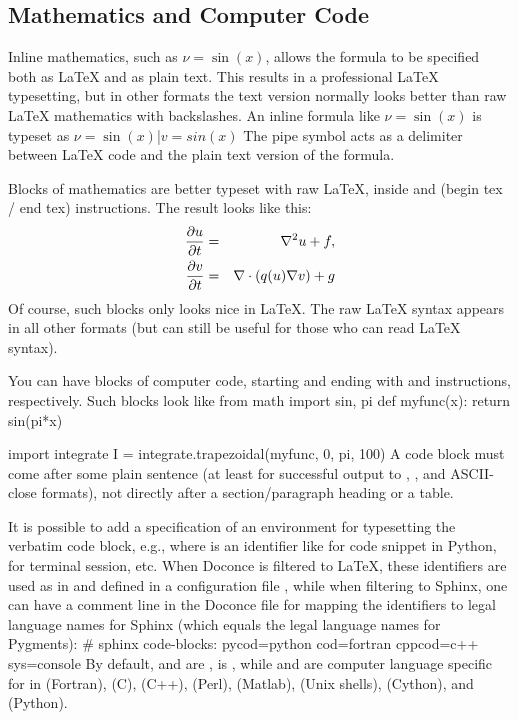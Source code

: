 \documentclass{book}
\begin{document}
\noindent

\subsection{Mathematics and Computer Code}

Inline mathematics, such as $\nu = \sin(x)$,
allows the formula to be specified both as {\LaTeX} and as plain text.
This results in a professional {\LaTeX} typesetting, but in other formats
the text version normally looks better than raw {\LaTeX} mathematics with
backslashes. An inline formula like $\nu = \sin(x)$ is
typeset as
\bccq
$\nu = \sin(x)$|$v = sin(x)$
\eccq
The pipe symbol acts as a delimiter between {\LaTeX} code and the plain text
version of the formula.

Blocks of mathematics are better typeset with raw {\LaTeX}, inside
 and  (begin tex / end tex) instructions.
The result looks like this:
\begin{eqnarray}
{\partial u\over\partial t} &=& \nabla^2 u + f, \label{myeq1}\\
{\partial v\over\partial t} &=& \nabla\cdot(q(u)\nabla v) + g
\end{eqnarray}
Of course, such blocks only looks nice in {\LaTeX}. The raw
{\LaTeX} syntax appears in all other formats (but can still be useful
for those who can read {\LaTeX} syntax).

You can have blocks of computer code, starting and ending with
 and  instructions, respectively. Such blocks look like
\bcod
from math import sin, pi
def myfunc(x):
    return sin(pi*x)

import integrate
I = integrate.trapezoidal(myfunc, 0, pi, 100)
\ecod
A code block must come after some plain sentence (at least for successful
output to , , and ASCII-close formats),
not directly after a section/paragraph heading or a table.

It is possible to add a specification of an
environment for typesetting the verbatim code block, e.g., 
where  is an identifier like  for code snippet in Python,
 for terminal session, etc. When Doconce is filtered to {\LaTeX},
these identifiers are used as in  and defined in a
configuration file , while when filtering
to Sphinx, one can have a comment line in the Doconce file for
mapping the identifiers to legal language names for Sphinx (which equals
the legal language names for Pygments):
\bccq
# sphinx code-blocks: pycod=python cod=fortran cppcod=c++ sys=console
\eccq
By default,  and  are ,  is ,
while  and  are computer language specific for 
in  (Fortran),  (C),  (C++),  (Perl),  (Matlab),
 (Unix shells),  (Cython), and  (Python).
\end{document}
